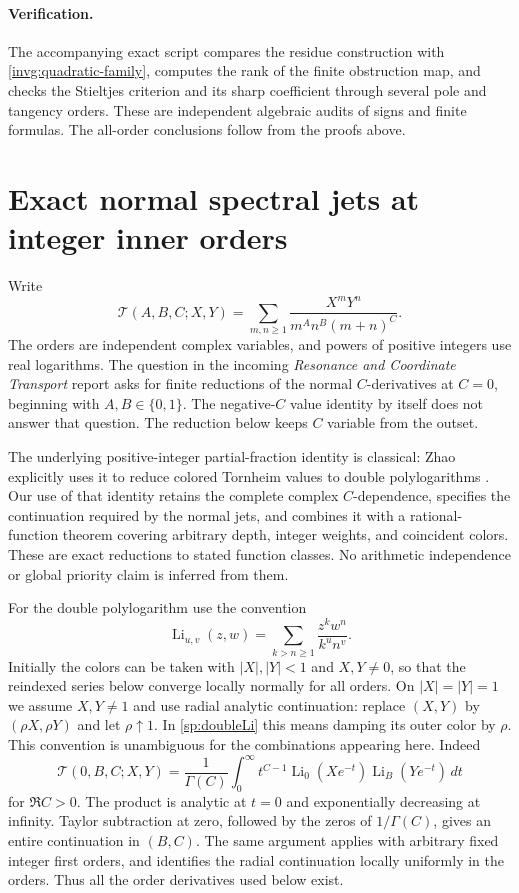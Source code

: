 \documentclass[11pt,a4paper]{article}
\theoremstyle{definition}
\theoremstyle{remark}
\numberwithin{equation}{section}
\begin{document}
\paragraph{Verification.}
The accompanying exact script compares the residue construction with
\eqref{invg:quadratic-family}, computes the rank of the finite
obstruction map, and checks the Stieltjes criterion and its sharp
coefficient through several pole and tangency orders.  These are
independent algebraic audits of signs and finite formulas.  The
all-order conclusions follow from the proofs above.


\section{Exact normal spectral jets at integer inner orders}
\label{sp:sec:normal}

Write
\[
 \mathcal T(A,B,C;X,Y)
 =\sum_{m,n\geq1}\frac{X^mY^n}{m^A n^B(m+n)^C}.
\]
The orders are independent complex variables, and powers of positive
integers use real logarithms.  The question in the incoming
\emph{Resonance and Coordinate Transport} report asks for finite
reductions of the normal $C$-derivatives at $C=0$, beginning with
$A,B\in\{0,1\}$.  The negative-$C$ value identity by itself does not
answer that question.  The reduction below keeps $C$ variable from
the outset.

The underlying positive-integer partial-fraction identity is classical:
Zhao explicitly uses it to reduce colored Tornheim values to double
polylogarithms \cite{sp:Zhao}.  Our use of that identity retains the
complete complex $C$-dependence, specifies the continuation required
by the normal jets, and combines it with a rational-function theorem
covering arbitrary depth, integer weights, and coincident colors.
These are exact reductions to stated function classes.  No arithmetic
independence or global priority claim is inferred from them.

For the double polylogarithm use the convention
\begin{equation}\label{sp:doubleLi}
 \operatorname{Li}_{u,v}(z,w)
   =\sum_{k>n\geq1}\frac{z^k w^n}{k^u n^v}.
\end{equation}
Initially the colors can be taken with $|X|,|Y|<1$ and $X,Y\ne0$,
so that the reindexed series below converge locally normally for all
orders.  On $|X|=|Y|=1$ we assume $X,Y\ne1$ and use radial analytic
continuation: replace $(X,Y)$ by $(\rho X,\rho Y)$ and let
$\rho\uparrow1$.  In \eqref{sp:doubleLi} this means damping its outer
color by $\rho$.  This convention is unambiguous for the combinations
appearing here.  Indeed
\[
 \mathcal T(0,B,C;X,Y)
 =\frac1{\Gamma(C)}\int_0^\infty
 t^{C-1}\operatorname{Li}_0(Xe^{-t})
                    \operatorname{Li}_B(Ye^{-t})\,dt
\]
for $\Re C>0$.  The product is analytic at $t=0$ and exponentially
decreasing at infinity.  Taylor subtraction at zero, followed by the
zeros of $1/\Gamma(C)$, gives an entire continuation in $(B,C)$.
The same argument applies with arbitrary fixed integer first orders,
and identifies the radial continuation locally uniformly in the
orders.  Thus all the order derivatives used below exist.
\end{document}
